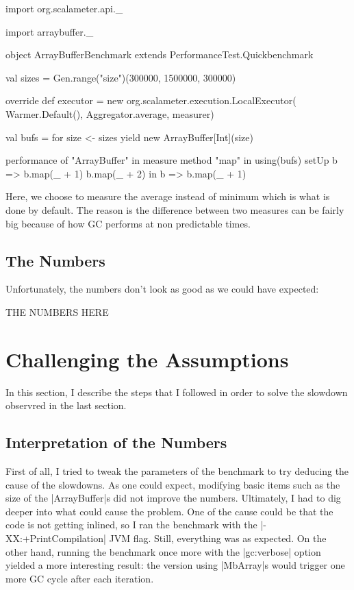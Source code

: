 \begin{lstlisting-nobreak}
import org.scalameter.api._

import arraybuffer._

object ArrayBufferBenchmark extends PerformanceTest.Quickbenchmark {
  val sizes = Gen.range("size")(300000, 1500000, 300000)
  
  override def executor = new org.scalameter.execution.LocalExecutor(
    Warmer.Default(),
    Aggregator.average,
    measurer)
    
  val bufs = for {
    size <- sizes
  } yield new ArrayBuffer[Int](size)

  performance of "ArrayBuffer" in {
    measure method "map" in {
      using(bufs) setUp {
        b =>
          b.map(_ + 1)
          b.map(_ + 2)
      } in {
        b => b.map(_ + 1)
      }
    }
  }
}
\end{lstlisting-nobreak}

Here, we choose to measure the average instead of minimum which is what is done by default. The reason is the difference between two measures can be fairly big because of how GC performs at non predictable times. 

\subsection{The Numbers}

Unfortunately, the numbers don't look as good as we could have expected:

THE NUMBERS HERE 

\section{Challenging the Assumptions}

In this section, I describe the steps that I followed in order to solve the slowdown observred in the last section.

\subsection{Interpretation of the Numbers}

First of all, I tried to tweak the parameters of the benchmark to try deducing the cause of the slowdowns. As one could expect, modifying basic items such as the size of the |ArrayBuffer|s did not improve the numbers. Ultimately, I had to dig deeper into what could cause the problem. One of the cause could be that the code is not getting inlined, so I ran the benchmark with the |-XX:+PrintCompilation| JVM flag. Still, everything was as expected. On the other hand, running the benchmark once more with the |gc:verbose| option yielded a more interesting result: the version using |MbArray|s would trigger one more GC cycle after each iteration.

